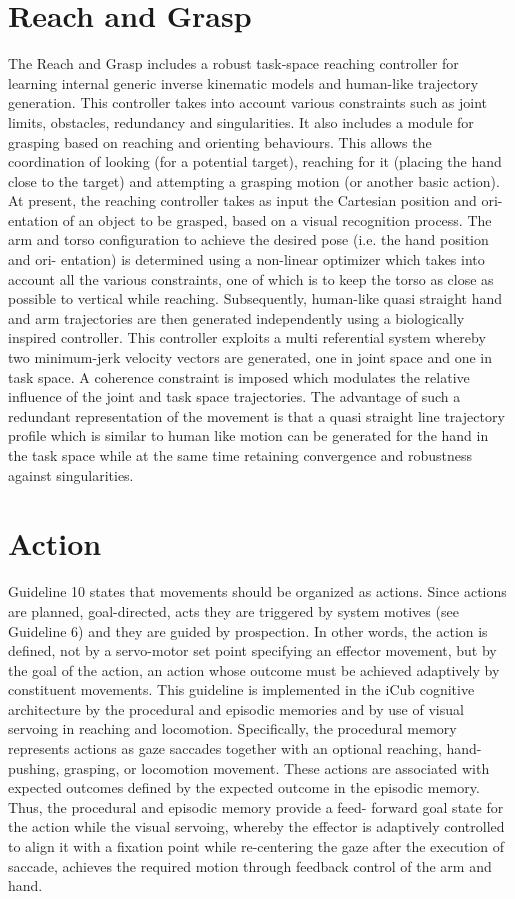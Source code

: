 \documentclass[a4paper, 11pt]{report}
\begin{document}
\section{Reach and Grasp}
The Reach and Grasp includes a robust task-space reaching controller 
for learning internal generic inverse kinematic models and human-like 
trajectory generation. This controller takes into account various constraints 
such as joint limits, obstacles, redundancy and singularities. It also includes 
a module for grasping based on reaching and orienting behaviours. This allows 
the coordination of looking (for a potential target), reaching for it (placing 
the hand close to the target) and attempting a grasping motion (or another 
basic action).
At present, the reaching controller takes as input the Cartesian position and 
ori- entation of an object to be grasped, based on a visual recognition 
process. The arm and torso configuration to achieve the desired pose (i.e. the 
hand position and ori- entation) is determined using a non-linear optimizer 
which takes into account all the various constraints, one of which is to keep 
the torso as close as possible to vertical while reaching. Subsequently, 
human-like quasi straight hand and arm trajectories are then generated 
independently using a biologically inspired controller. This controller 
exploits a multi referential system whereby two minimum-jerk velocity
vectors are generated, one in joint space and one in task space. A 
coherence constraint is imposed which modulates the relative influence of the 
joint and task space trajectories. The advantage of such a redundant 
representation of the movement is that a quasi straight line trajectory 
profile which is similar to human like motion can be generated for the hand in 
the task space while at the same time retaining convergence and robustness 
against singularities.
\section{Action}
Guideline 10 states that movements should be organized as actions. Since 
actions are planned, goal-directed, acts they are triggered by system motives 
(see Guideline 6) and they are guided by prospection. In other words, the 
action is defined, not by a servo-motor set point specifying an effector 
movement, but by the goal of the action, an action whose outcome must be 
achieved adaptively by constituent movements. This guideline is implemented in 
the iCub cognitive architecture by the procedural and episodic memories and by 
use of visual servoing in reaching and locomotion. Specifically, the procedural 
memory represents actions as gaze saccades together with an optional reaching, 
hand-pushing, grasping, or locomotion movement. These actions are associated 
with expected outcomes defined by the expected outcome in the episodic memory. 
Thus, the procedural and episodic memory provide a feed- forward goal state for 
the action while the visual servoing, whereby the effector is adaptively 
controlled to align it with a fixation point while re-centering the gaze after 
the execution of saccade, achieves the required motion through feedback 
control of the arm and hand.
\end{document}
